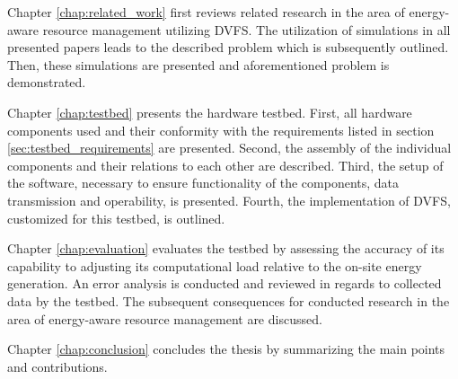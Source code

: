 Chapter \ref{chap:related_work} first reviews related research in the area of
energy-aware resource management utilizing DVFS. The utilization of simulations
in all presented papers leads to the described problem which is subsequently
outlined. Then, these simulations are presented and aforementioned problem is
demonstrated.

Chapter \ref{chap:testbed} presents the hardware testbed. First, all hardware
components used and their conformity with the requirements listed in section
\ref{sec:testbed_requirements} are presented. Second, the assembly of the
individual components and their relations to each other are described. Third,
the setup of the software, necessary to ensure functionality of the components,
data transmission and operability, is presented. Fourth, the implementation of
DVFS, customized for this testbed, is outlined.

Chapter \ref{chap:evaluation} evaluates the testbed by assessing the accuracy of
its capability to adjusting its computational load relative to the on-site
energy generation. An error analysis is conducted and reviewed in regards to
collected data by the testbed. The subsequent consequences for conducted
research in the area of energy-aware resource management are discussed.

Chapter \ref{chap:conclusion} concludes the thesis by summarizing the main
points and contributions.

